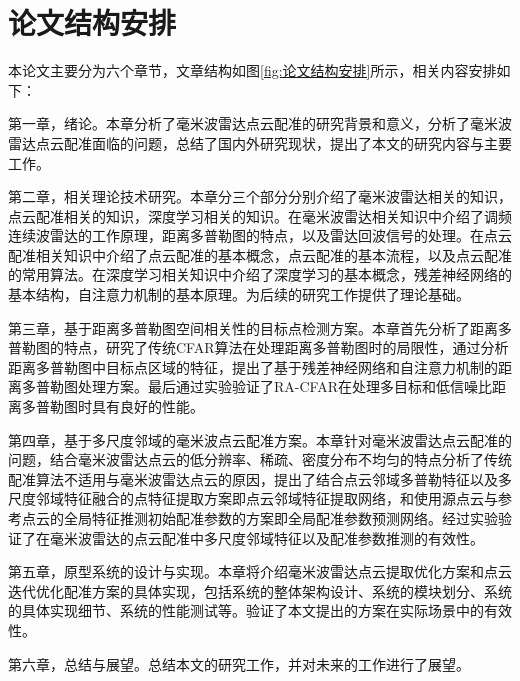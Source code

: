 \section{论文结构安排}
本论文主要分为六个章节，文章结构如图\ref{fig:论文结构安排}所示，相关内容安排如下：
\par
第一章，绪论。本章分析了毫米波雷达点云配准的研究背景和意义，分析了毫米波雷达点云配准面临的问题，总结了国内外研究现状，提出了本文的研究内容与主要工作。
\par
第二章，相关理论技术研究。本章分三个部分分别介绍了毫米波雷达相关的知识，点云配准相关的知识，深度学习相关的知识。在毫米波雷达相关知识中介绍了调频连续波雷达的工作原理，距离多普勒图的特点，以及雷达回波信号的处理。在点云配准相关知识中介绍了点云配准的基本概念，点云配准的基本流程，以及点云配准的常用算法。在深度学习相关知识中介绍了深度学习的基本概念，残差神经网络的基本结构，自注意力机制的基本原理。为后续的研究工作提供了理论基础。
\par
第三章，基于距离多普勒图空间相关性的目标点检测方案。本章首先分析了距离多普勒图的特点，研究了传统CFAR算法在处理距离多普勒图时的局限性，通过分析距离多普勒图中目标点区域的特征，提出了基于残差神经网络和自注意力机制的距离多普勒图处理方案。最后通过实验验证了RA-CFAR在处理多目标和低信噪比距离多普勒图时具有良好的性能。
\par
第四章，基于多尺度邻域的毫米波点云配准方案。本章针对毫米波雷达点云配准的问题，结合毫米波雷达点云的低分辨率、稀疏、密度分布不均匀的特点分析了传统配准算法不适用与毫米波雷达点云的原因，提出了结合点云邻域多普勒特征以及多尺度邻域特征融合的点特征提取方案即点云邻域特征提取网络，和使用源点云与参考点云的全局特征推测初始配准参数的方案即全局配准参数预测网络。经过实验验证了在毫米波雷达的点云配准中多尺度邻域特征以及配准参数推测的有效性。
\par
第五章，原型系统的设计与实现。本章将介绍毫米波雷达点云提取优化方案和点云迭代优化配准方案的具体实现，包括系统的整体架构设计、系统的模块划分、系统的具体实现细节、系统的性能测试等。验证了本文提出的方案在实际场景中的有效性。
\par
第六章，总结与展望。总结本文的研究工作，并对未来的工作进行了展望。
